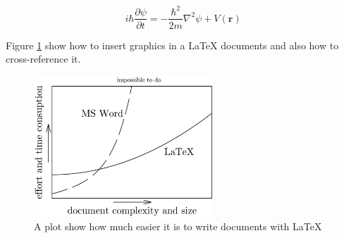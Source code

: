 \begin{equation}
i\hbar \frac{\partial \psi}{\partial t} = -\frac{\hbar^2}{2m}\nabla^2 \psi + V(\mathbf{r})
\label{eq:Schr}
\end{equation}

Figure \ref{fig:WordVsLatex} show how to insert graphics in a \LaTeX{} documents and also how to cross-reference it.

\begin{figure}[h!]
\centering
\includegraphics[width=0.6\textwidth]{images/WordVsLatex.png}
\caption{A plot show how much easier it is to write documents with \LaTeX{}} \label{fig:WordVsLatex}
\end{figure}